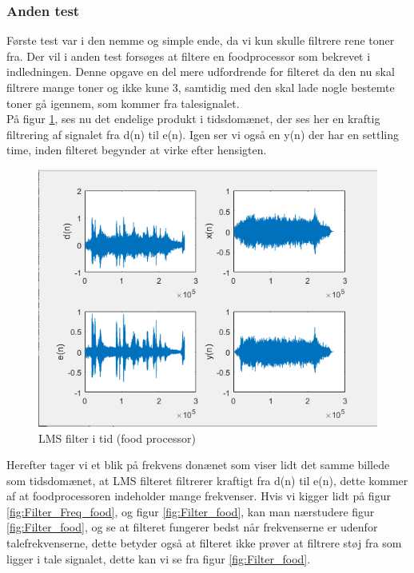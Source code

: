 \subsubsection{Anden test}
Første test var i den nemme og simple ende, da vi kun skulle filtrere rene toner fra. Der vil i anden test forsøges at filtere en foodprocessor som bekrevet i indledningen. Denne opgave en del mere udfordrende for filteret da den nu skal filtrere mange toner og ikke kune 3, samtidig med den skal lade nogle bestemte toner gå igennem, som kommer fra talesignalet. \\
På figur \ref{fig:Filter_time_food}, ses nu det endelige produkt i tidsdomænet, der ses her en kraftig filtrering af signalet fra d(n) til e(n). Igen ser vi også en y(n) der har en settling time, inden filteret begynder at virke efter hensigten. 

\begin{figure}[H]
	\centering
	\includegraphics[width = 400pt]{Img/Filter_time_food}
	\caption{LMS filter i tid (food processor)}
	\label{fig:Filter_time_food}
\end{figure}
\newpage

Herefter tager vi et blik på frekvens donænet som viser lidt det samme billede som tidsdomænet, at LMS filteret filtrerer kraftigt fra d(n) til e(n), dette kommer af at foodprocessoren indeholder mange frekvenser. Hvis vi kigger lidt på figur \ref{fig:Filter_Freq_food}, og figur \ref{fig:Filter_food}, kan man nærstudere figur \ref{fig:Filter_food}, og se at filteret fungerer bedst når frekvenserne er udenfor talefrekvenserne, dette betyder også at filteret ikke prøver at filtrere støj fra som ligger i tale signalet, dette kan vi se fra figur \ref{fig:Filter_food}.

